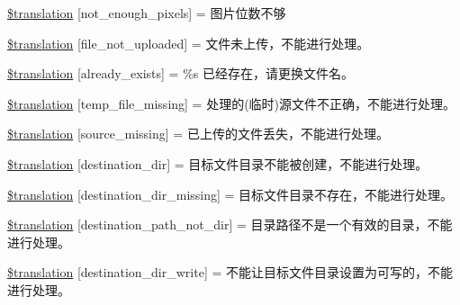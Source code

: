 \begin{DoxyCompactItemize}
\item 
\hyperlink{class_8upload_8zh___c_n_8php_a1fe342c27ce61f4ff4e0120ba647033e}{\$translation} \mbox{[}\textquotesingle{}not\+\_\+enough\+\_\+pixels\textquotesingle{}\mbox{]} = \textquotesingle{}图片位数不够\textquotesingle{}
\item 
\hyperlink{class_8upload_8zh___c_n_8php_a4ce76e7be0b3a03c2b47f6d70c21832e}{\$translation} \mbox{[}\textquotesingle{}file\+\_\+not\+\_\+uploaded\textquotesingle{}\mbox{]} = \textquotesingle{}文件未上传，不能进行处理。\textquotesingle{}
\item 
\hyperlink{class_8upload_8zh___c_n_8php_afd84e910217f04139f567c41e292afa5}{\$translation} \mbox{[}\textquotesingle{}already\+\_\+exists\textquotesingle{}\mbox{]} = \textquotesingle{}\%s 已经存在，请更换文件名。\textquotesingle{}
\item 
\hyperlink{class_8upload_8zh___c_n_8php_ab0fa87a88aba2624004581eed0633325}{\$translation} \mbox{[}\textquotesingle{}temp\+\_\+file\+\_\+missing\textquotesingle{}\mbox{]} = \textquotesingle{}处理的(临时)源文件不正确，不能进行处理。\textquotesingle{}
\item 
\hyperlink{class_8upload_8zh___c_n_8php_aceaaf7355acaaf10f0ae60378d03c468}{\$translation} \mbox{[}\textquotesingle{}source\+\_\+missing\textquotesingle{}\mbox{]} = \textquotesingle{}已上传的文件丢失，不能进行处理。\textquotesingle{}
\item 
\hyperlink{class_8upload_8zh___c_n_8php_aff2427c72a2598aefa6d58df1dd18b08}{\$translation} \mbox{[}\textquotesingle{}destination\+\_\+dir\textquotesingle{}\mbox{]} = \textquotesingle{}目标文件目录不能被创建，不能进行处理。\textquotesingle{}
\item 
\hyperlink{class_8upload_8zh___c_n_8php_a9ef28d3cf09942c6c0a1e77fa09185e8}{\$translation} \mbox{[}\textquotesingle{}destination\+\_\+dir\+\_\+missing\textquotesingle{}\mbox{]} = \textquotesingle{}目标文件目录不存在，不能进行处理。\textquotesingle{}
\item 
\hyperlink{class_8upload_8zh___c_n_8php_a5704a67137126e8c87b7a364175929d4}{\$translation} \mbox{[}\textquotesingle{}destination\+\_\+path\+\_\+not\+\_\+dir\textquotesingle{}\mbox{]} = \textquotesingle{}目录路径不是一个有效的目录，不能进行处理。\textquotesingle{}
\item 
\hyperlink{class_8upload_8zh___c_n_8php_a97608ea194a616db49141a0e6dee900c}{\$translation} \mbox{[}\textquotesingle{}destination\+\_\+dir\+\_\+write\textquotesingle{}\mbox{]} = \textquotesingle{}不能让目标文件目录设置为可写的，不能进行处理。\textquotesingle{}

\end{DoxyCompactItemize}
